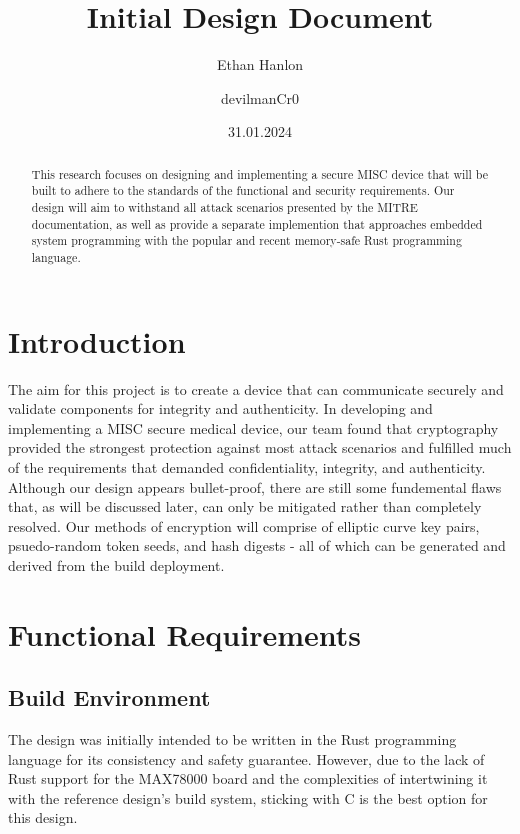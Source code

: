 \documentclass{prace}
\title{Initial Design Document}
\date{31.01.2024}
\author[1]{Ethan Hanlon}
\author[1]{devilmanCr0}
\affiliation{San Francisco State University, 1600 Holloway Avenue, San Francisco, CA 94132, USA}
\begin{document}
\maketitle
\begin{abstract}
This research focuses on designing and implementing a secure MISC device that will be built to adhere to the standards of the functional and security requirements. Our design will 
aim to withstand all attack scenarios presented by the MITRE documentation, as well as provide a separate implemention that approaches embedded system programming with the popular and recent memory-safe Rust programming language. 
\end{abstract}

\section{Introduction}

The aim for this project is to create a device that can communicate securely and validate components for integrity and authenticity.
In developing and implementing a MISC secure medical device, our team found that cryptography
provided the strongest protection against most attack scenarios and fulfilled much of the requirements
that demanded confidentiality, integrity, and authenticity. Although our design appears bullet-proof, there are still
some fundemental flaws that, as will be discussed later, can only be mitigated rather than completely resolved. Our methods of encryption will comprise of elliptic curve key pairs, 
psuedo-random token seeds, and hash digests - all of which can be generated and derived from the build deployment.

\section{Functional Requirements}

\subsection{Build Environment}

The design was initially intended to be written in the Rust programming language for its consistency and safety guarantee. However,
due to the lack of Rust support for the MAX78000 board and the complexities of intertwining it with the reference design's build system, sticking with C 
is the best option for this design.
\end{document}
